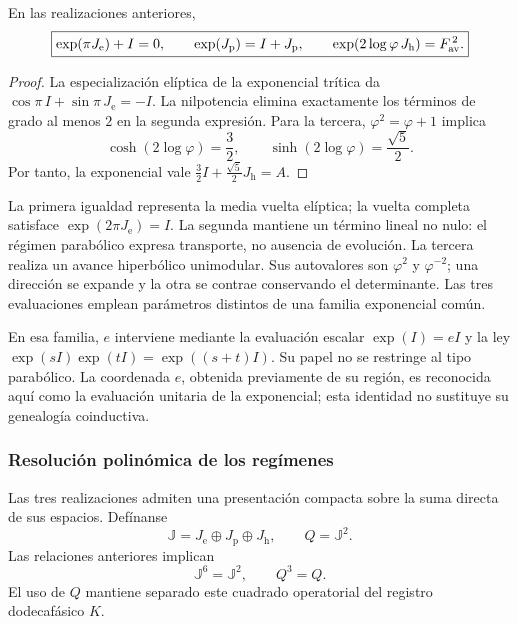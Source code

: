 \begin{proposition}
\label{x_reciprocidad:euler-trit-evaluaciones}
En las realizaciones anteriores,
\begin{equation}
 \boxed{
 \exp(\pi J_{\mathrm e})+I=0,\qquad
 \exp(J_{\mathrm p})=I+J_{\mathrm p},\qquad
 \exp(2\log\varphi\,J_{\mathrm h})=F_{\rm av}^{\,2}.}
 \label{x_reciprocidad:euler-trit-tres-evaluaciones}
\end{equation}
\end{proposition}
\begin{proof}
La especialización elíptica de la exponencial trítica da
\(\cos\pi\,I+\sin\pi\,J_{\mathrm e}=-I\).
La nilpotencia elimina exactamente los términos de grado al menos \(2\)
en la segunda expresión. Para la tercera, \(\varphi^2=\varphi+1\) implica
\[
 \cosh(2\log\varphi)=\frac32,\qquad
 \sinh(2\log\varphi)=\frac{\sqrt5}{2}.
\]
Por tanto, la exponencial vale
\(\frac32I+\frac{\sqrt5}{2}J_{\mathrm h}=A\).
\end{proof}

La primera igualdad representa la media vuelta elíptica; la vuelta completa
satisface \(\exp(2\pi J_{\mathrm e})=I\). La segunda mantiene un término
lineal no nulo: el régimen parabólico expresa transporte, no ausencia de
evolución. La tercera realiza un avance hiperbólico unimodular. Sus
autovalores son \(\varphi^2\) y \(\varphi^{-2}\); una dirección se expande y
la otra se contrae conservando el determinante. Las tres evaluaciones
emplean parámetros distintos de una familia exponencial común.

En esa familia, \(e\) interviene mediante la evaluación escalar
\(\exp(I)=eI\) y la ley \(\exp(sI)\exp(tI)=\exp((s+t)I)\).
Su papel no se restringe al tipo parabólico. La coordenada \(e\), obtenida
previamente de su región, es reconocida aquí como la evaluación unitaria
de la exponencial; esta identidad no sustituye su genealogía coinductiva.

\subsubsection{Resolución polinómica de los regímenes}

Las tres realizaciones admiten una presentación compacta sobre la suma
directa de sus espacios. Defínanse
\[
 \mathbb J=J_{\mathrm e}\oplus J_{\mathrm p}\oplus J_{\mathrm h},
 \qquad Q=\mathbb J^2.
\]
Las relaciones anteriores implican
\[
 \mathbb J^6=\mathbb J^2,\qquad Q^3=Q.
\]
El uso de \(Q\) mantiene separado este cuadrado operatorial del registro
dodecafásico \(K\).

